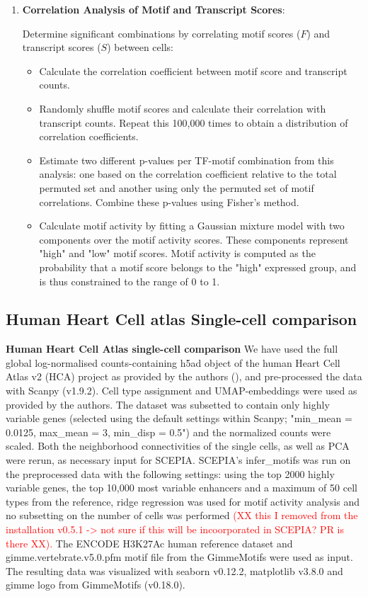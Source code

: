 \begin{enumerate}
    \item \textbf{Correlation Analysis of Motif and Transcript Scores}:
    
    Determine significant combinations by correlating motif scores ($F$) and transcript scores ($S$) between cells:
    \begin{itemize}
        \item Calculate the correlation coefficient between motif score and transcript counts.
        \item Randomly shuffle motif scores and calculate their correlation with transcript counts. Repeat this 100,000 times to obtain a distribution of correlation coefficients.
        \item Estimate two different p-values per TF-motif combination from this analysis: one based on the correlation coefficient relative to the total permuted set and another using only the permuted set of motif correlations. Combine these p-values using Fisher's method.
        \item Calculate motif activity by fitting a Gaussian mixture model with two components over the motif activity scores. These components represent "high" and "low" motif scores. Motif activity is computed as the probability that a motif score belongs to the "high" expressed group, and is thus constrained to the range of 0 to 1.
    \end{itemize}
\end{enumerate}

\subsection{Human Heart Cell atlas Single-cell comparison}
\textbf{Human Heart Cell Atlas single-cell comparison }
We have used the full global log-normalised counts-containing h5ad object of the human Heart Cell Atlas v2 (HCA) project as provided by the authors (\cite{Kanemaru2023}), and pre-processed the data with Scanpy (v1.9.2). Cell type assignment and UMAP-embeddings were used as provided by the authors. The dataset was subsetted to contain only highly variable genes (selected using the default settings within Scanpy; "min\_mean = 0.0125, max\_mean = 3, min\_disp = 0.5") and the normalized counts were scaled. Both the neighborhood connectivities of the single cells, as well as PCA were rerun, as necessary input for SCEPIA. SCEPIA's infer\_motifs was run on the preprocessed data with the following settings: using the top 2000 highly variable genes, the top 10,000 most variable enhancers and a maximum of 50 cell types from the reference, ridge regression was used for motif activity analysis and no subsetting on the number of cells was performed \textcolor{red}{(XX this I removed from the installation v0.5.1 -> not sure if this will be incoorporated in SCEPIA? PR is there XX).} The ENCODE H3K27Ac human reference dataset and gimme.vertebrate.v5.0.pfm motif file from the GimmeMotifs were used as input. The resulting data was visualized with seaborn v0.12.2, matplotlib v3.8.0 and gimme logo from GimmeMotifs (v0.18.0).

